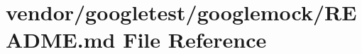 \hypertarget{vendor_2googletest_2googlemock_2readme_8md}{}\section{vendor/googletest/googlemock/\+R\+E\+A\+D\+ME.md File Reference}
\label{vendor_2googletest_2googlemock_2readme_8md}
